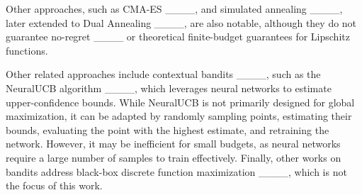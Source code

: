 Other approaches, such as CMA-ES ____, and simulated annealing ____, later extended to Dual Annealing ____, are also notable, although they do not guarantee no-regret ____ or theoretical finite-budget guarantees for Lipschitz functions.

Other related approaches include contextual bandits ____, such as the NeuralUCB algorithm ____, which leverages neural networks to estimate upper-confidence bounds. While NeuralUCB is not primarily designed for global maximization, it can be adapted by randomly sampling points, estimating their bounds, evaluating the point with the highest estimate, and retraining the network. However, it may be inefficient for small budgets, as neural networks require a large number of samples to train effectively. Finally, other works on bandits address black-box discrete function maximization ____, which is not the focus of this work.